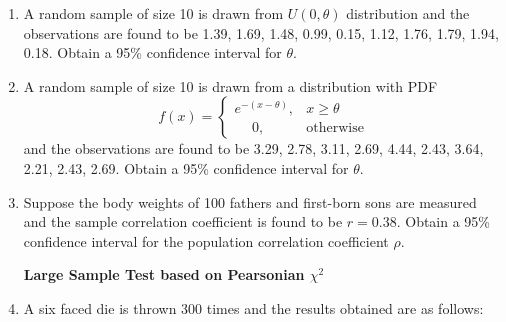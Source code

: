 \documentclass[11pt, a4paper]{article}
\begin{document}
\begin{enumerate}
	
	
	\item A random sample of size 10 is drawn from $U(0, \theta)$ distribution and the observations are found to be 1.39, 1.69, 1.48, 0.99, 0.15, 1.12, 1.76, 1.79, 1.94, 0.18. Obtain a 95\% confidence interval for $\theta$.
	
	
	

\vspace{50pt}
	
	
	
	
	\item A random sample of size 10 is drawn from a distribution with PDF
	\begin{equation*}
	f(x) = 
		\begin{cases}
		e^{-\left(x-\theta\right)}, & x \geq \theta \\
		\hspace{15pt} 0, & \text{otherwise}
		\end{cases}	
	\end{equation*}
	and the observations are found to be 3.29, 2.78, 3.11, 2.69, 4.44, 2.43, 3.64, 2.21, 2.43, 2.69. Obtain a 95\% confidence interval for $\theta$.
	


\vspace{50pt}	
	
	
	\item Suppose the body weights of 100 fathers and first-born sons are measured and the sample correlation 
coefficient is found to be $r = 0.38$. Obtain a 95\% confidence interval for the population correlation 
coefficient $\rho$. 





\newpage

\begin{center}

\textbf{\LARGE Large Sample Test based on Pearsonian $\chi^2$}

\end{center}


\vspace{30pt}



	
	\item A six faced die is thrown 300 times and the results obtained are as follows:
	\begin{table}[!htbp]
	\def\arraystretch{1.5}
	
	\begin{center}
	\begin{tabular}{|>{\centering}m{2.5cm}||>{\centering}m{1cm}|>{\centering}m{1cm}|>{\centering}m{1cm}|>{\centering}m{1cm}|>{\centering}m{1cm}|>{\centering\arraybackslash}m{1cm}|}
	

\end{tabular}
\end{center}
\end{table}
\end{enumerate}
\end{document}
